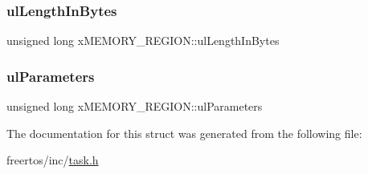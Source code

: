 \subsubsection{\texorpdfstring{ul\+Length\+In\+Bytes}{ulLengthInBytes}}
{\footnotesize\ttfamily unsigned long x\+M\+E\+M\+O\+R\+Y\+\_\+\+R\+E\+G\+I\+O\+N\+::ul\+Length\+In\+Bytes}

\mbox{\label{structx_m_e_m_o_r_y___r_e_g_i_o_n_a8750b0cad9c8b2c602ca9f0f2342b3aa}} 
\subsubsection{\texorpdfstring{ul\+Parameters}{ulParameters}}
{\footnotesize\ttfamily unsigned long x\+M\+E\+M\+O\+R\+Y\+\_\+\+R\+E\+G\+I\+O\+N\+::ul\+Parameters}



The documentation for this struct was generated from the following file\+:\begin{DoxyCompactItemize}
\item 
freertos/inc/\mbox{\hyperlink{task_8h}{task.\+h}}\end{DoxyCompactItemize}
